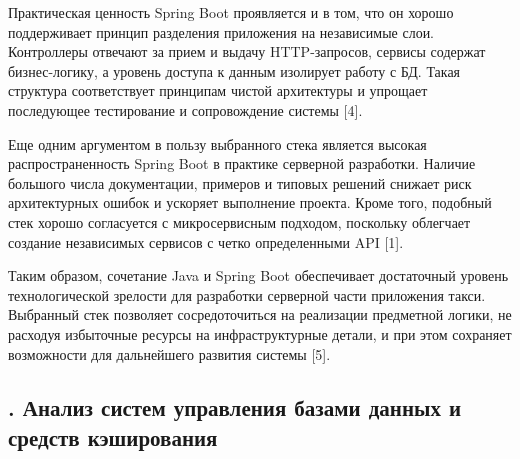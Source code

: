 {  \par \redline Практическая ценность Spring Boot проявляется и в том, что он хорошо поддерживает принцип разделения приложения на независимые слои. Контроллеры отвечают за прием и выдачу HTTP-запросов, сервисы содержат бизнес-логику, а уровень доступа к данным изолирует работу с БД. Такая структура соответствует принципам чистой архитектуры и упрощает последующее тестирование и сопровождение системы [4].

  \par \redline Еще одним аргументом в пользу выбранного стека является высокая распространенность Spring Boot в практике серверной разработки. Наличие большого числа документации, примеров и типовых решений снижает риск архитектурных ошибок и ускоряет выполнение проекта. Кроме того, подобный стек хорошо согласуется с микросервисным подходом, поскольку облегчает создание независимых сервисов с четко определенными API [1].

  \par \redline Таким образом, сочетание Java и Spring Boot обеспечивает достаточный уровень технологической зрелости для разработки серверной части приложения такси. Выбранный стек позволяет сосредоточиться на реализации предметной логики, не расходуя избыточные ресурсы на инфраструктурные детали, и при этом сохраняет возможности для дальнейшего развития системы [5].

}

\subtitlespace

\subsection*{
  \gostTitleFont
  \redline
  \thechaptercntr .\thesubchaptercntr \spc
  Анализ систем управления базами данных и средств кэширования
} \addtocounter{subchaptercntr}{1}

\subtitlespace

